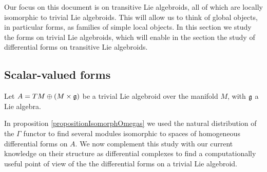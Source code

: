     

Our focus on this document is on transitive Lie algebroids, all of which are locally isomorphic to trivial Lie algebroids. This will allow us to think of global objects, in particular forms, as families of simple local objects. In this section we study the forms on trivial Lie algebroids, which will enable in the section the study of differential forms on transitive Lie algebroids.

\subsection{Scalar-valued forms}

Let $A = TM \oplus (M \times \mathfrak{g})$ be a trivial Lie algebroid over the manifold $M$, with $\mathfrak{g}$ a Lie algebra.

In proposition \ref{propositionIsomorphOmegas} we used the natural distribution of the $\Gamma$ functor to find several modules isomorphic to spaces of homogeneous differential forms on $A$. We now complement this study with our current knowledge on their structure as differential complexes to find a computationally useful point of view of the the differential forms on a trivial Lie algebroid.

